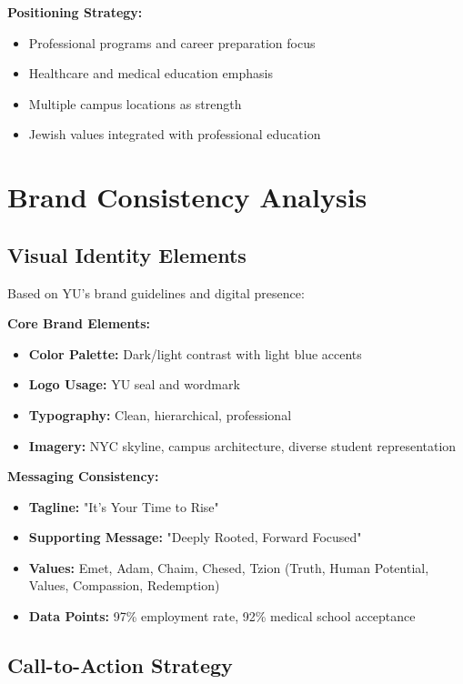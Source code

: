 \documentclass[12pt,letterpaper]{article}
\begin{document}
\textbf{Positioning Strategy:}
\begin{itemize}[leftmargin=*]
    \item Professional programs and career preparation focus
    \item Healthcare and medical education emphasis
    \item Multiple campus locations as strength
    \item Jewish values integrated with professional education
\end{itemize}

\section{Brand Consistency Analysis}

\subsection{Visual Identity Elements}

Based on YU's brand guidelines and digital presence:

\textbf{Core Brand Elements:}
\begin{itemize}[leftmargin=*]
    \item \textbf{Color Palette:} Dark/light contrast with light blue accents
    \item \textbf{Logo Usage:} YU seal and wordmark
    \item \textbf{Typography:} Clean, hierarchical, professional
    \item \textbf{Imagery:} NYC skyline, campus architecture, diverse student representation
\end{itemize}

\textbf{Messaging Consistency:}
\begin{itemize}[leftmargin=*]
    \item \textbf{Tagline:} "It's Your Time to Rise"
    \item \textbf{Supporting Message:} "Deeply Rooted, Forward Focused"
    \item \textbf{Values:} Emet, Adam, Chaim, Chesed, Tzion (Truth, Human Potential, Values, Compassion, Redemption)
    \item \textbf{Data Points:} 97\% employment rate, 92\% medical school acceptance
\end{itemize}

\subsection{Call-to-Action Strategy}
\end{document}
